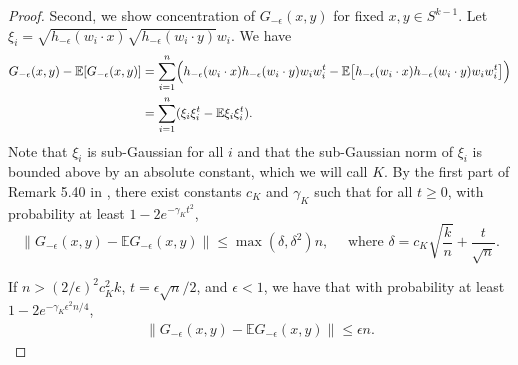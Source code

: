 \documentclass[11pt]{article}
\newcommand{\eps}{\epsilon}
\newcommand{\spherek}{S^{k-1}}
\newcommand{\tran}{t}
\newcommand{\wi}{w_i}
\newcommand{\wix}{w_i \cdot x}
\newcommand{\wiy}{w_i \cdot y}
\newcommand{\wit}{w_i^\tran}
\newcommand{\hmeps}{h_{-\eps}}
\newcommand{\Gmeps}{G_{-\eps}}
\newcommand{\wiwit}{\wi\wit}
\newcommand{\xii}{\xi_i}
\newcommand{\xiit}{\xii^\tran}
\newcommand{\xiixiit}{\xi_i\xiit}
\newcommand{\E}{\mathbb{E}}
\begin{document}
\begin{proof}
Second, we show concentration of $\Gmeps(x,y)$ for fixed $x,y \in \spherek$.  Let $\xii = \sqrt{\hmeps(\wix)} \sqrt{\hmeps(\wiy)} \wi$.  We have
\begin{align}
\Gmeps(x,y) - \E[ \Gmeps(x,y) ] &= \sum_{i=1}^n  \Bigl( \hmeps(\wix) \hmeps(\wiy) \wiwit - \E\bigl[ \hmeps(\wix) \hmeps(\wiy) \wiwit \bigr]   \Bigr) \\&= \sum_{i=1}^n (\xiixiit - \E \xiixiit).
\end{align}
Note that $\xii$ is sub-Gaussian for all $i$ and that the sub-Gaussian norm of $\xii$ is bounded above by an absolute constant, which we will call $K$.  By the first part of Remark 5.40 in \cite{V2012}, there exist constants $c_K$ and $\gamma_K$ such that for all $t \geq 0$, with probability at least $1 - 2 e ^{-\gamma_K t^2}$,
\[
\| \Gmeps(x,y) - \E \Gmeps(x,y) \| \leq \max(\delta, \delta^2) n, \quad \text{ where } \delta = c_K \sqrt{\frac{k}{n}} + \frac{t}{\sqrt{n}}.
\]

If $n > (2/\eps)^2 c_K^2 k$, $t = \eps \sqrt{n}/2$, and $\eps < 1$, we have that with probability at least $1-2e^{-\gamma_K \eps^2 n/4}$,
\begin{align}
\| \Gmeps(x,y) - \E \Gmeps(x,y) \| \leq \eps n.   \label{bound-Gmeps-concentration-uniform} 
\end{align}


\end{proof}
\end{document}
